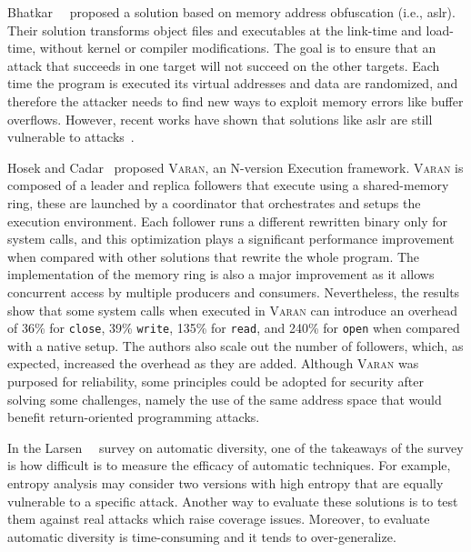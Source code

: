 Bhatkar~\etal{}~\cite{Bhatkar:2003} proposed a solution based on memory address obfuscation (i.e., \gls{aslr}). 
Their solution transforms object files and executables at the link-time and load-time, without kernel or compiler modifications. 
The goal is to ensure that an attack that succeeds in one target will not succeed on the other targets. 
Each time the program is executed its virtual addresses and data are randomized, and therefore the attacker needs to find new ways to exploit memory errors like buffer overflows. 
However, recent works have shown that solutions like \gls{aslr} are still vulnerable to attacks~\cite{Bittau:2014,Jang:2016}.


Hosek and Cadar~\cite{Hosek:2015} proposed \textsc{Varan}, an N-version Execution framework.
\textsc{Varan} is composed of a leader and replica followers that execute using a shared-memory ring, these are launched by a coordinator that orchestrates and setups the execution environment.
Each follower runs a different rewritten binary only for system calls, and this optimization plays a significant performance improvement when compared with other solutions that rewrite the whole program.
The implementation of the memory ring is also a major improvement as it allows concurrent access by multiple producers and consumers.
Nevertheless, the results show that some system calls when executed in \textsc{Varan} can introduce an overhead of 36\% for \texttt{close}, 39\% \texttt{write}, 135\% for \texttt{read}, and 240\% for \texttt{open} when compared with a native setup.
The authors also scale out the number of followers, which, as expected, increased the overhead as they are added. 
Although \textsc{Varan} was purposed for reliability, some principles could be adopted for security after solving some challenges, namely the use of the same address space that would benefit return-oriented programming attacks.

In the Larsen~\etal{}~\cite{Larsen:2015} survey on automatic diversity, one of the takeaways of the survey is how difficult is to measure the efficacy of automatic techniques.
For example, entropy analysis may consider two versions with high entropy that are equally vulnerable to a specific attack.
Another way to evaluate these solutions is to test them against real attacks which raise coverage issues.
Moreover, to evaluate automatic diversity is time-consuming and it tends to over-generalize.


